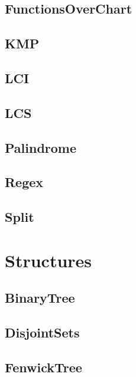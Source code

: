 \subsection{ FunctionsOverChart}
\raggedbottom
\hrulefill
\subsection{ KMP}
\raggedbottom
\hrulefill
\subsection{ LCI}
\raggedbottom
\hrulefill
\subsection{ LCS}
\raggedbottom
\hrulefill
\subsection{ Palindrome}
\raggedbottom
\hrulefill
\subsection{ Regex}
\raggedbottom
\hrulefill
\subsection{ Split}
\raggedbottom
\hrulefill

\section{Structures}
\subsection{ BinaryTree}
\raggedbottom
\hrulefill
\subsection{ DisjointSets}
\raggedbottom
\hrulefill
\subsection{ FenwickTree}
\raggedbottom
\hrulefill
